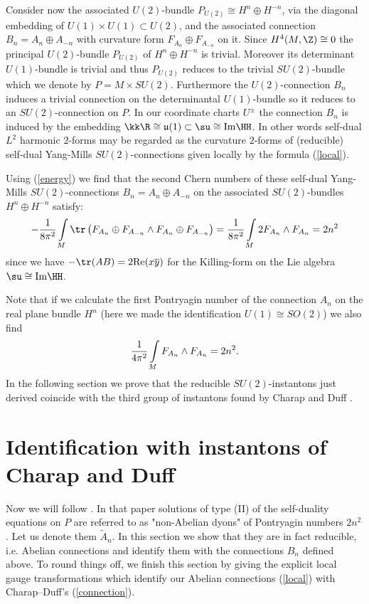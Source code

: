 \documentclass[a4paper,12pt,draft]{article}
\begin{document}
Consider now the associated
$U(2)$-bundle $P_{U(2)}\cong H^n\oplus H^{-n}$, 
via the diagonal embedding of 
$U(1)\times U(1)\subset U(2)$, and the associated connection 
$B_n=A_n\oplus A_{-n}$ with curvature
form $F_{A_n}\oplus F_{A_{-n}}$ on it.  Since $H^4(M,\Z)\cong 0$
the principal $U(2)$-bundle $P_{U(2)}$ of $H^n\oplus H^{-n}$ is
trivial. Moreover its determinant $U(1)$-bundle is trivial and thus 
$P_{U(2)}$ reduces to the trivial $SU(2)$-bundle which we
denote by $P = M\times SU(2)$.  
Furthermore the $U(2)$-connection 
$B_n$ induces a 
trivial connection on the  
determinantal $U(1)$-bundle so it reduces 
to an $SU(2)$-connection on $P$. In our
coordinate charts $U^\pm$ the connection 
$B_n$ is induced by the embedding $\kk\R\cong{\mathfrak u}(1)\subset\su
\cong{\rm Im}\HH$. In other words  self-dual $L^2$ harmonic $2$-forms may 
be regarded as the curvature
$2$-forms of (reducible) self-dual Yang-Mills $SU(2)$-connections given 
locally by the formula (\ref{local}). 

Using (\ref{energy}) we find that the second Chern numbers of these
self-dual Yang-Mills $SU(2)$-connections $B_n=A_n\oplus A_{-n}$ on the 
associated $SU(2)$-bundles $H^n\oplus H^{-n}$ satisfy: 
\[-{1\over 8\pi^2}\int\limits_M\tr\left( F_{A_n}\oplus
F_{A_{-n}}\wedge F_{A_n}\oplus F_{A_{-n}}\right)={1\over
8\pi^2} \int\limits_M 2F_{A_n}\wedge F_{A_n}=2n^2\]
since we have $-\tr (AB)=2{\rm Re}(x\overline{y})$ for the Killing-form on
the Lie algebra $\su\cong{\rm Im}\HH$. 

Note that if we calculate the first Pontryagin number of the connection
$A_n$ on the real plane bundle $H^n$ 
(here we made the identification $U(1)\cong SO(2)$) 
we also find
\[{1\over 4\pi^2}\int\limits_M F_{A_n}\wedge F_{A_n} = 2n^2.\]
In the following section we prove that the reducible $SU(2)$-instantons just
derived coincide with the third group of instantons  found by 
Charap and Duff \cite{charap-duff}.



\section{Identification with instantons of Charap and Duff}



Now we will follow \cite{charap-duff}. In that paper solutions of type  
(II) of the self-duality equations on $P$ 
are referred to as "non-Abelian dyons"
of Pontryagin numbers $2n^2$. Let us denote them $\widetilde{A}_n$. 
In this section we show that they are in fact  
reducible, i.e.  
Abelian connections and identify them with the connections $B_n$ 
defined above. To round things off, we finish this section by giving 
the explicit local gauge transformations which identify our Abelian 
connections (\ref{local}) with Charap--Duff's (\ref{connection}).
\end{document}
